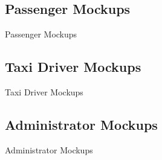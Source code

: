 \documentclass{../common/latex_classes/pdf_presentation}
\begin{document}
	\subsection{Passenger Mockups}
	
	\begin{frame}{Passenger Mockups}
	\end{frame}
	
	\subsection{Taxi Driver Mockups}
	
	\begin{frame}{Taxi Driver Mockups}
	\end{frame}
	
	\subsection{Administrator Mockups}
	
	\begin{frame}{Administrator Mockups}
	\end{frame}
	
\end{document}
